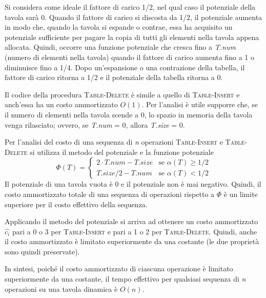 \documentclass[10pt, a4paper]{report}
\begin{document}
Si considera come ideale il fattore di carico 1/2, nel qual caso il potenziale della tavola sarà 0. Quando il fattore di carico si discosta da 1/2, il potenziale aumenta in modo che, quando la tavola si espande o contrae, essa ha acquisito un potenziale sufficiente per pagare la copia di tutti gli elementi nella tavola appena allocata. Quindi, occorre una funzione potenziale che cresca fino a \textit{T.num} (numero di elementi nella tavola) quando il fattore di carico aumenta fino a 1 o diminuisce fino a 1/4. Dopo un'espansione o una contrazione della tabella, il fattore di carico ritorna a 1/2 e il potenziale della tabella ritorna a 0.

Il codice della procedura \textsc{Table-Delete} è simile a quello di \textsc{Table-Insert} e anch'essa ha un costo ammortizzato $O(1)$. Per l'analisi è utile supporre che, se il numero di elementi nella tavola scende a 0, lo spazio in memoria della tavola venga rilasciato; ovvero, se \textit{T.num} = 0, allora \textit{T.size} = 0.

Per l'analisi del costo di una sequenza di \textit{n} operazioni \textsc{Table-Insert} e \textsc{Table-Delete} si utilizza il metodo del potenziale e la funzione potenziale
\begin{equation*}
\Phi(T) = \left\{
\begin{array}{ll}
2 \cdot T.num - T. size &\text{se } \alpha(T) \geq 1/2\\
T.size/2 - T.num &\text{se } \alpha(T) < 1/2
\end{array}\right.
\end{equation*}
Il potenziale di una tavola vuota è 0 e il potenziale non è mai negativo. Quindi, il costo ammortizzato totale di una sequenza di operazioni rispetto a $\Phi$ è un limite superiore per il costo effettivo della sequenza.

Applicando il metodo del potenziale si arriva ad ottenere un costo ammortizzato $\widehat{c_i}$ pari a 0 o 3 per \textsc{Table-Insert} e pari a 1 o 2 per \textsc{Table-Delete}. Quindi, anche il costo ammortizzato è limitato superiormente da una costante (le due proprietà sono quindi preservate).

In sintesi, poiché il costo ammortizzato di ciascuna operazione è limitato superiormente da una costante, il tempo effettivo per qualsiasi sequenza di \textit{n} operazioni su una tavola dinamica è $O(n)$.
\end{document}
